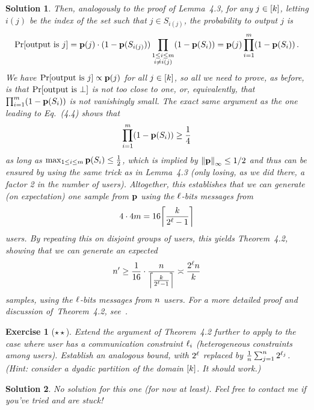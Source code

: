\documentclass[biber]{nowfnt} %
\newtheorem{question}{Exercise}[chapter]
\newtheorem{solution}{Solution}[chapter]
\begin{document}
\begin{solution}
Then, analogously to the proof of Lemma~4.3, for any $j\in[k]$, letting $i(j)$ be the index of the set such that $j\in S_{i(j)}$, the probability to output $j$ is
\[
	\bPr{\text{output is } j } = \p(j)\cdot (1-\p(S_{i(j)})) \prod_{\substack{1\leq i\leq m\\ i\neq i(j)}} (1-\p(S_i)) = \p(j) \prod_{i=1}^m (1-\p(S_i))\,.
\]
We have $\bPr{\text{output is } j }\propto \p(j)$ for all $j\in[k]$, so all we need to prove, as before, is that $\bPr{\text{output is } \bot }$ is not too close to one, or, equivalently, that $\prod_{i=1}^m (1-\mathbf{p}(S_i))$ is not vanishingly small. The exact same argument as the one leading to Eq.~(4.4) shows that 
\[
	\prod_{i=1}^m (1-\mathbf{p}(S_i)) \geq \frac{1}{4}
\]
as long as $\max_{1\leq i\leq m} \mathbf{p}(S_i) \leq \frac{1}{2}$, which is implied by $\norminf{\p} \leq 1/2$ and thus can be ensured by using the same trick as in Lemma~4.3 (only losing, as we did there, a factor 2 in the number of users). Altogether, this establishes that we can generate (on expectation) \emph{one} sample from $\mathbf{p}$ using the $\ell$-bits messages from
\[
		4 \cdot 4m = 16\clg{\frac{\ab}{2^\numbits -1}}
\]
users. By repeating this on disjoint groups of users, this yields Theorem~4.2, showing that we can generate an expected
\[
	\ns' \geq \frac{1}{16}\cdot \frac{\ns}{\clg{\frac{\ab}{2^\numbits -1}}} \asymp \frac{2^\numbits\ns}{\ab}
\]
\iid samples, using the $\ell$-bits messages from $n$ users. For a more detailed proof and discussion of~Theorem~4.2, see~\citet[Theorem~IV.9]{AcharyaCT19b}.
\end{solution}

\begin{question}[$\star\star$]\label{exo:heterogeneous}
Extend the argument of Theorem~4.2 further to apply to the case where user has a communication constraint $\ell_i$ (heterogeneous constraints among users). Establish an analogous bound, with $2^\ell$ replaced by $\frac{1}{n}\sum_{j=1}^n 2^{\ell_j}$. \emph{(Hint: consider a dyadic partition of the domain $[k]$. It \emph{should} work.)}
\end{question}
\begin{solution}\itshape
No solution for this one (for now at least). Feel free to contact me if you've tried and are stuck!
\end{solution}
  
  
\printbibliography
\end{document}
